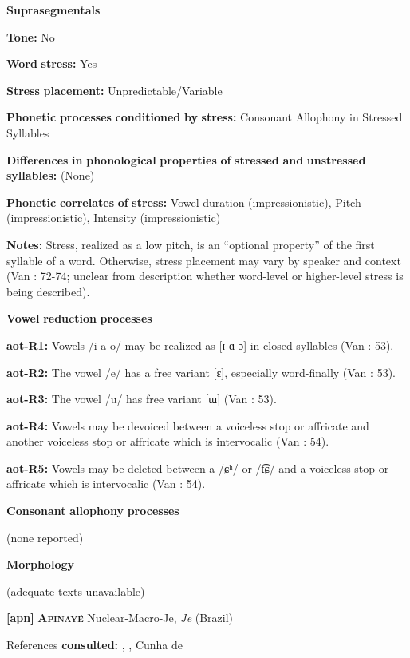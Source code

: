 \begin{styleBody}
\textbf{Suprasegmentals}

\textbf{Tone:} No

\textbf{Word} \textbf{stress:} Yes

\textbf{Stress} \textbf{placement:} Unpredictable/Variable

\textbf{Phonetic} \textbf{processes} \textbf{conditioned} \textbf{by} \textbf{stress:} Consonant Allophony in Stressed Syllables

\textbf{Differences} \textbf{in} \textbf{phonological} \textbf{properties} \textbf{of} \textbf{stressed} \textbf{and} \textbf{unstressed} \textbf{syllables:} (None)

\textbf{Phonetic} \textbf{correlates} \textbf{of} \textbf{stress:} Vowel duration (impressionistic), Pitch (impressionistic), Intensity (impressionistic)

\textbf{Notes:} Stress, realized as a low pitch, is an “optional property” of the first syllable of a word. Otherwise, stress placement may vary by speaker and context (Van \citealt{Breugel2008}: 72-74; unclear from description whether word-level or higher-level stress is being described).

\textbf{Vowel} \textbf{reduction} \textbf{processes}

\textbf{aot-R1:} Vowels /i a o/ may be realized as [ɪ ɑ ɔ] in closed syllables (Van \citealt{Breugel2008}: 53).

\textbf{aot-R2:} The vowel /e/ has a free variant [ɛ], especially word-finally (Van \citealt{Breugel2008}: 53).

\textbf{aot-R3:} The vowel /u/ has free variant [ɯ] (Van \citealt{Breugel2008}: 53).

\textbf{aot-R4:} Vowels may be devoiced between a voiceless stop or affricate and another voiceless stop or affricate which is intervocalic (Van \citealt{Breugel2008}: 54).

\textbf{aot-R5:} Vowels may be deleted between a /ɕʰ/ or /t͡ɕ/ and a voiceless stop or affricate which is intervocalic (Van \citealt{Breugel2008}: 54).

\textbf{Consonant} \textbf{allophony} \textbf{processes}

(none reported)

\textbf{Morphology}

(adequate texts unavailable)

\textbf{[apn]}   \textbf{\textsc{Apinayé}}  Nuclear-Macro-Je, \textit{Je} (Brazil)

References \textbf{consulted:} \citet{BurgessHam1968}, \citet{Ham2009}, Cunha de \citet{Oliveira2005}


\end{styleBody}
